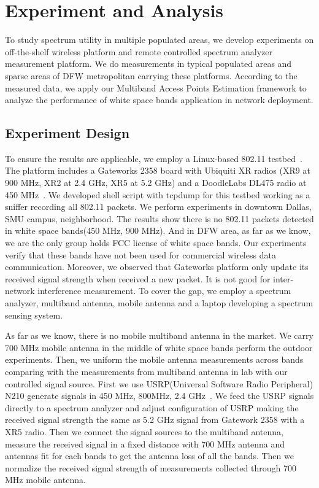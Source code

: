 \section{Experiment and Analysis}
\label{sec:experimentdesign}

To study spectrum utility in multiple populated areas, we develop experiments on off-the-shelf 
wireless platform and remote controlled spectrum analyzer measurement platform.
We do measurements in typical populated areas and sparse areas of DFW metropolitan 
carrying these platforms. According to the measured data, we apply our Multiband 
Access Points Estimation framework to analyze the performance of white space 
bands application in network deployment.

\subsection{Experiment Design}
To ensure the results are applicable, we employ a Linux-based 802.11 testbed~\cite{Gateworks}.
The platform includes a Gateworks 2358 board with Ubiquiti XR radios (XR9 at 900 MHz, 
XR2 at 2.4 GHz, XR5 at 5.2 GHz) and a DoodleLabs DL475 radio at 450 MHz~\cite{Ubnt,Gateworks}.
We developed shell script with tcpdump for this testbed working as a sniffer recording all 
802.11 packets.
We perform experiments in downtown Dallas, SMU campus, neighborhood. The results show there
 is no 802.11 packets detected in white space bands(450 MHz, 900 MHz). And in DFW area, as 
 far as we know, we are the only group holds FCC license of white space bands. 
 Our experiments verify that these bands have not been used for commercial wireless data communication.
Moreover, we observed that Gateworks platform only update its received signal strength when received
a new packet. It is not good for inter-network interference measurement. To cover the gap, 
we employ a spectrum analyzer, multiband antenna, mobile antenna and a laptop developing 
a spectrum sensing system. 

As far as we know, there is no mobile multiband antenna in the market. We carry 700 MHz
mobile antenna in the middle of white space bands perform the outdoor experiments. 
Then, we uniform the mobile antenna 
measurements across bands comparing with the measurements from multiband antenna in 
lab with our controlled signal source. First we use USRP(Universal Software Radio Peripheral) 
N210 generate signals in 450 MHz, 800MHz, 2.4 GHz~\cite{usrp}. We feed the USRP 
signals directly to a spectrum analyzer and adjust configuration of USRP making 
the received signal strength the same as 5.2 GHz signal from Gatework 2358 with 
a XR5 radio. Then we connect the signal sources to the multiband antenna, measure the 
received signal in a fixed distance with 700 MHz antenna and antennas fit for each bands
to get the antenna loss of all the bands. Then we normalize the received signal strength 
of measurements collected through 700 MHz mobile antenna.

